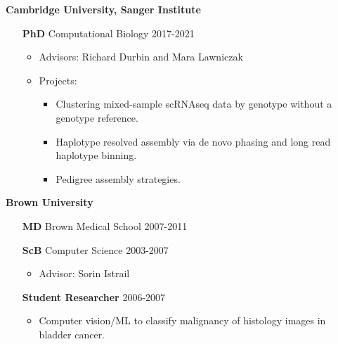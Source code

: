 \documentclass[10pt]{res}
\begin{document}
\begin{resume}
	{\bf Cambridge University, Sanger Institute}
	\begin{itemize}[leftmargin=0.75in,topsep=2pt,noitemsep]
		\item[{\bf PhD}]  Computational Biology \hfill 2017-2021
		\begin{itemize}[label=$\bullet$, leftmargin=0.0in,noitemsep,topsep=-5pt]
			\item Advisors: Richard Durbin and Mara Lawniczak
			\item Projects:
				\begin{itemize}[noitemsep]
					\item Clustering mixed-sample scRNAseq data by genotype without a genotype reference.
					\item Haplotype resolved assembly via de novo phasing and long read haplotype binning.
					\item Pedigree assembly strategies.
				\end{itemize}
		\end{itemize}
	\end{itemize}
	{\bf Brown University}
	\begin{itemize}[leftmargin=0.75in,topsep=2pt, noitemsep]
		\item[{\bf MD}] Brown Medical School \hfill 2007-2011 
		\item[{\bf ScB}] Computer Science \hfill 2003-2007
			\begin{itemize}[label=$\bullet$, leftmargin=0.0in, noitemsep,topsep=-5pt]
				\item Advisor: Sorin Istrail
			\end{itemize}
	\end{itemize}
	\begin{itemize}[leftmargin=1.85in,topsep=5pt, noitemsep]
		\item[{\bf Student Researcher}] \hfill 2006-2007
			\begin{itemize}[label=$\bullet$, leftmargin=-1.1in, noitemsep,topsep=-5pt]
				\item Computer vision/ML to classify malignancy of histology images in bladder cancer.
			\end{itemize}
	\end{itemize}


\end{resume}
\end{document}
